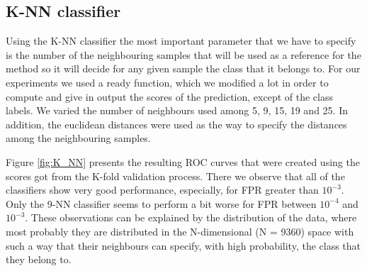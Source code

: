 \subsection{K-NN classifier}
\noindent Using the K-NN classifier the most important parameter that we have to specify is the number of the neighbouring samples that will be used as a reference for the method so it will decide for any given sample the class that it belongs to. For our experiments we used a ready function, which we modified a lot in order to compute and give in output the scores of the prediction, except of the class labels. We varied the number of neighbours used among 5, 9, 15, 19 and 25. In addition, the euclidean distances were used as the way to specify the distances among the neighbouring samples.

\noindent Figure \ref{fig:K_NN} presents the resulting ROC curves that were created using the scores got from the K-fold validation process. There we observe that all of the classifiers show very good performance, especially, for FPR greater than $10^{-3}$. Only the 9-NN classifier seems to perform a bit worse for FPR between $10^{-4}$ and $10^{-3}$. These observations can be explained by the distribution of the data, where most probably they are distributed in the N-dimensional (N = 9360) space with such a way that their neighbours can specify, with high probability, the class that they belong to.

